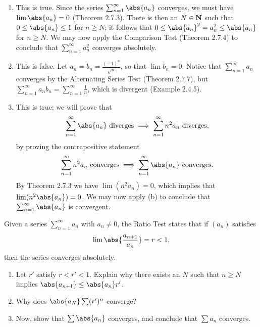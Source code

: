 \documentclass{lew98_solutions}
\begin{document}
\begin{solution}
    \begin{enumerate}
        \item This is true. Since the series \( \sum_{n=1}^{\infty} \abs{a_n} \) converges, we must have \( \lim \abs{a_n} = 0 \) (Theorem 2.7.3). There is then an \( N \in \mathbf{N} \) such that \( 0 \leq \abs{a_n} \leq 1 \) for \( n \geq N \); it follows that \( 0 \leq \abs{a_n}^2 = a_n^2 \leq \abs{a_n} \) for \( n \geq N \). We may now apply the Comparison Test (Theorem 2.7.4) to conclude that \( \sum_{n=1}^{\infty} a_n^2 \) converges absolutely.

        \item This is false. Let \( a_n = b_n = \tfrac{(-1)^n}{\sqrt{n}} \), so that \( \lim b_n = 0 \). Notice that \( \sum_{n=1}^{\infty} a_n \) converges by the Alternating Series Test (Theorem 2.7.7), but \( \sum_{n=1}^{\infty} a_n b_n = \sum_{n=1}^{\infty} \tfrac{1}{n} \), which is divergent (Example 2.4.5).

        \item This is true; we will prove that
        \[
            \sum_{n=1}^{\infty} \abs{a_n} \text{ diverges} \implies \sum_{n=1}^{\infty} n^2 a_n \text{ diverges},
        \]
        by proving the contrapositive statement
        \[
            \sum_{n=1}^{\infty} n^2 a_n \text{ converges} \implies \sum_{n=1}^{\infty} \abs{a_n} \text{ converges}.
        \]
        By Theorem 2.7.3 we have \( \lim(n^2 a_n) = 0 \), which implies that \( \lim(n^2 \abs{a_n}) = 0 \). We may now apply  (b) to conclude that \( \sum_{n=1}^{\infty} \abs{a_n} \) is convergent.
    \end{enumerate}
\end{solution}

\begin{exercise}
\label{ex:2.7.9}
    Given a series \( \sum_{n=1}^{\infty} a_n \) with \( a_n \neq 0 \), the Ratio Test states that if \( (a_n) \) satisfies
    \[
        \lim \abs{\frac{a_{n+1}}{a_n}} = r < 1,
    \]
    then the series converges absolutely.
    \begin{enumerate}
        \item Let \( r' \) satisfy \( r < r' < 1 \). Explain why there exists an \( N \) such that \( n \geq N \) implies \( \abs{a_{n+1}} \leq \abs{a_n} r' \).

        \item Why does \( \abs{a_N} \sum (r')^n \) converge?

        \item Now, show that \( \sum \abs{a_n} \) converges, and conclude that \( \sum a_n \) converges.
    \end{enumerate}
\end{exercise}
\end{document}
